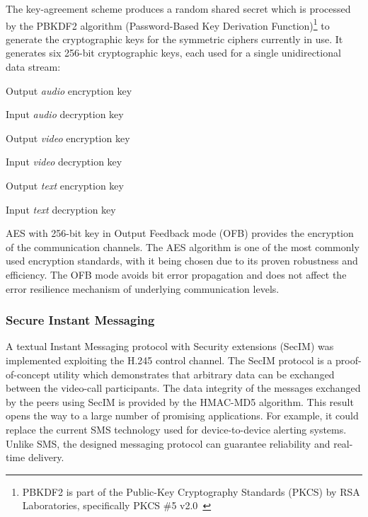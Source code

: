 \documentclass[10pt, conference, compsocconf]{IEEEtran}
\begin{document}
The key-agreement scheme produces a random shared secret which is processed by the PBKDF2 algorithm (Password-Based Key Derivation Function)\footnote{PBKDF2 is part of the Public-Key Cryptography Standards (PKCS) by RSA Laboratories, specifically PKCS \#5 v2.0~\cite{pkcs}} to generate the cryptographic keys for the symmetric ciphers currently in use.
It generates six 256-bit cryptographic keys, each used for a single unidirectional data stream:
\begin{list}{}{\leftmargin=1em}
  \item Output \textit{audio} encryption key 
  \item Input \textit{audio} decryption key
  \item Output \textit{video} encryption key
  \item Input \textit{video} decryption key
  \item Output \textit{text} encryption key
  \item Input \textit{text} decryption key
\\
\end{list}

AES with 256-bit key in Output Feedback mode (OFB) provides the encryption of the communication channels.
The AES algorithm is one of the most commonly used encryption standards, with it being chosen due to its proven robustness and efficiency. The OFB mode avoids bit error propagation and does not affect the error resilience mechanism of underlying communication levels.
\\
\subsubsection{Secure Instant Messaging}
A textual Instant Messaging protocol with Security extensions (SecIM) was implemented exploiting the H.245 control channel. The SecIM protocol is a proof-of-concept utility which demonstrates that arbitrary data can be exchanged between the video-call participants. The data integrity of the messages exchanged by the peers using SecIM is provided by the HMAC-MD5 algorithm.
This result opens the way to a large number of promising applications. For example, it could replace the current SMS technology used for device-to-device alerting systems. Unlike SMS, the designed messaging protocol can guarantee reliability and real-time delivery.
\\
\end{document}
